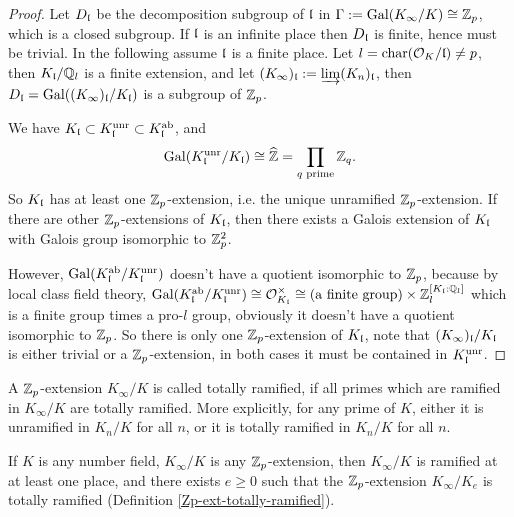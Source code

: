 \begin{proof}
Let $D_{\mathfrak{l}}$ be the decomposition subgroup of ${\mathfrak{l}}$ in $\Gamma:={\mathrm{Gal}}(K_\infty/K)\cong{\mathbb {Z}}_p$,
which is a closed subgroup.
If ${\mathfrak{l}}$ is an infinite place then $D_{\mathfrak{l}}$ is finite, hence must be trivial.
In the following assume ${\mathfrak{l}}$ is a finite place.
Let $l=\operatorname{char}({\mathcal {O}}_K/{\mathfrak{l}})\neq p$, then $K_{\mathfrak{l}}/{\mathbb {Q}}_l$ is a finite extension,
and let $(K_\infty)_{\mathfrak{l}}:=\varinjlim(K_n)_{\mathfrak{l}}$, then
$D_{\mathfrak{l}}={\mathrm{Gal}}((K_\infty)_{\mathfrak{l}}/K_{\mathfrak{l}})$ is a subgroup of ${\mathbb {Z}}_p$.

We have $K_{\mathfrak{l}}\subset K_{\mathfrak{l}}^{\mathrm{unr}}\subset K_{\mathfrak{l}}^{\mathrm{ab}}$,
and
$$
{\mathrm{Gal}}(K_{\mathfrak{l}}^{\mathrm{unr}}/K_{\mathfrak{l}})\cong\widehat{{\mathbb {Z}}}
=\prod_{q\text{ prime}}{\mathbb {Z}}_q.
$$
So $K_{\mathfrak{l}}$ has at least one ${\mathbb {Z}}_p$-extension, i.e. the unique unramified
${\mathbb {Z}}_p$-extension. If there are other ${\mathbb {Z}}_p$-extensions of $K_{\mathfrak{l}}$,
then there exists a Galois extension of $K_{\mathfrak{l}}$ with Galois group
isomorphic to ${\mathbb {Z}}_p^2$.

However, ${\mathrm{Gal}}(K_{\mathfrak{l}}^{\mathrm{ab}}/K_{\mathfrak{l}}^{\mathrm{unr}})$
doesn't have a quotient isomorphic to ${\mathbb {Z}}_p$, because by
local class field theory,
${\mathrm{Gal}}(K_{\mathfrak{l}}^{\mathrm{ab}}/K_{\mathfrak{l}}^{\mathrm{unr}})\cong{\mathcal {O}}_{K_{\mathfrak{l}}}^\times\cong
(\text{a finite group})\times{\mathbb {Z}}_l^{[K_{\mathfrak{l}}:{\mathbb {Q}}_l]}$ which is a finite group
times a pro-$l$ group, obviously it doesn't have a quotient isomorphic to ${\mathbb {Z}}_p$.
So there is only one ${\mathbb {Z}}_p$-extension of $K_{\mathfrak{l}}$,
note that $(K_\infty)_{\mathfrak{l}}/K_{\mathfrak{l}}$ is either trivial or a ${\mathbb {Z}}_p$-extension,
in both cases it must be contained in $K_{\mathfrak{l}}^{\mathrm{unr}}$.
\end{proof}

\begin{definition}
\label{Zp-ext-totally-ramified}
A ${\mathbb {Z}}_p$-extension $K_\infty/K$ is called totally ramified, if
all primes which are ramified in $K_\infty/K$ are totally ramified.
More explicitly, for any prime of $K$,
either it is unramified in $K_n/K$ for all $n$,
or it is totally ramified in $K_n/K$ for all $n$.
\end{definition}

\begin{lem}
\label{exists-totally-ramified}
If $K$ is any number field, $K_\infty/K$ is any ${\mathbb {Z}}_p$-extension,
then $K_\infty/K$ is ramified at at least one place,
and there exists $e\geq 0$ such that the ${\mathbb {Z}}_p$-extension $K_\infty/K_e$
is totally ramified (Definition \ref{Zp-ext-totally-ramified}).
\end{lem}

